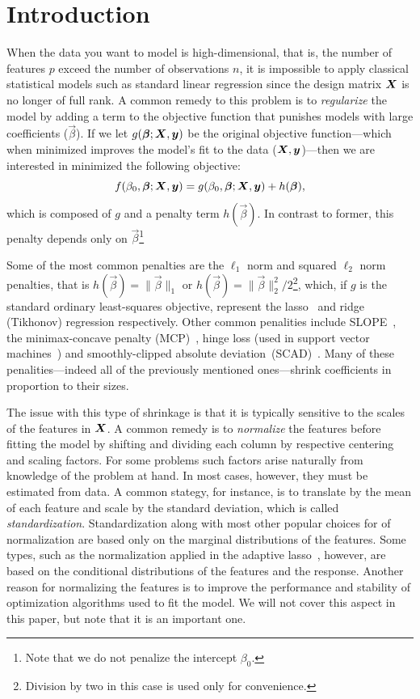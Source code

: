 \section{Introduction}

When the data you want to model is high-dimensional, that is, the number of features \(p\)
exceed the number of observations \(n\), it is impossible to apply classical statistical
models such as standard linear regression since the design matrix \(\boldsymbol X\) is no longer
of full rank. A common remedy to this problem is to \emph{regularize} the model by adding a
term to the objective function that punishes models with large coefficients
(\(\vec\beta\)). If we let \(g(\boldsymbol\beta; \boldsymbol X, \boldsymbol y)\) be the original objective
function---which when minimized improves the model's fit to the data (\(\boldsymbol X, \boldsymbol
y\))---then we are interested in minimized the following objective:
\begin{equation}
  \label{eq:general-objective}
  f(\beta_0, \boldsymbol\beta; \boldsymbol X, \boldsymbol y) = g(\beta_0, \boldsymbol\beta; \boldsymbol X, \boldsymbol y) + h(\boldsymbol\beta),
\end{equation}
which is composed of \(g\) and a penalty term \(h(\vec\beta)\). In
contrast to former, this penalty depends only on \(\vec{\beta}\)\footnote{Note that
  we do not penalize the intercept \(\beta_0\).}

Some of the most common penalties are the \(\ell_1\) norm and squared \(\ell_2\) norm
penalties, that is \(h(\vec\beta) = \lVert \vec\beta \rVert_1\) or \(h(\vec\beta) = \lVert
\vec\beta \rVert_2^2/2\)\footnote{Division by two in this case is used only for
  convenience.}, which, if \(g\) is the standard ordinary least-squares objective, represent
the lasso~\citep{tibshirani1996,santosa1986,donoho1994} and ridge (Tikhonov) regression
respectively. Other common penalities include SLOPE~\citep{bogdan2013,bogdan2015}, the
minimax-concave penalty (MCP)~\citep{zhang2010}, hinge loss (used in support vector
machines~\citep{cortes1995}) and smoothly-clipped absolute
deviation~(SCAD)~\citep{fan2001}. Many of these penalities---indeed all of the previously
mentioned ones---shrink coefficients in proportion to their sizes.

The issue with this type of shrinkage is that it is typically sensitive to the scales of
the features in \(\boldsymbol X\). A common remedy is to \emph{normalize} the features before
fitting the model by shifting and dividing each column by respective centering and scaling
factors. For some problems such factors arise naturally from knowledge of the problem at
hand. In most cases, however, they must be estimated from data. A common stategy, for
instance, is to translate by the mean of each feature and scale by the standard deviation,
which is called \emph{standardization}. Standardization along with most other popular
choices for of normalization are based only on the marginal distributions of the features.
Some types, such as the normalization applied in the adaptive lasso~\citep{zou2006},
however, are based on the conditional distributions of the features and the response.
Another reason for normalizing the features is to improve the performance and stability of
optimization algorithms used to fit the model. We will not cover this aspect in this paper,
but note that it is an important one.


